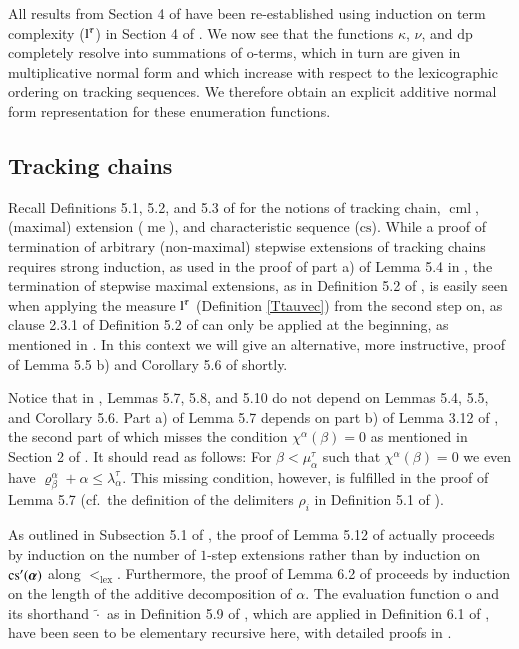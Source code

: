 \documentclass[3p,10pt,times]{elsarticle}
\newcommand{\al}{\alpha}
\newcommand{\alvec}{{\vec{\al}}}
\newcommand{\be}{\beta}
\newcommand{\la}{\lambda}
\newcommand{\ka}{\kappa}
\newcommand{\tauvec}{{\vec{\tau}}}
\newcommand{\klex}{<_\mathrm{\scriptscriptstyle{lex}}}
\newcommand{\ltvec}{{\operatorname{l}^\tauvec}}
\newcommand{\latal}{{\la^\tau_\al}}
\newcommand{\chial}{\chi^\al}
\newcommand{\mutal}{\mu^\tau_\al}
\newcommand{\rhoalbe}{{\varrho^\al_\be}}
\newcommand{\cs}{{\mathrm{cs}}}
\newcommand{\cspr}{{\mathrm{cs}^\prime}}
\newcommand{\dpf}{\mathrm{dp}}
\newcommand{\ov}{\mathrm{o}}
\newcommand{\cml}{\operatorname{cml}}
\newcommand{\me}{\operatorname{me}}
\def\vec#1{\mathchoice{\mbox{\boldmath$\displaystyle#1$}}
{\mbox{\boldmath$\textstyle#1$}}
{\mbox{\boldmath$\scriptstyle#1$}}
{\mbox{\boldmath$\scriptscriptstyle#1$}}}
\begin{document}
All results from Section 4 of \cite{CWc} have been re-established using induction on term complexity ($\ltvec$) in Section 4 of \cite{W}.
We now see that the functions $\ka$, $\nu$, and $\dpf$ completely resolve into summations of $\ov$-terms, which in turn are given in
multiplicative normal form and which increase with respect to the lexicographic ordering on tracking sequences. We therefore obtain
an explicit additive normal form representation for these enumeration functions.

\subsection{Tracking chains}\label{tcacsec}
Recall Definitions 5.1, 5.2, and 5.3 of \cite{CWc} for the notions of tracking chain, $\cml$\index{$\cml$}, (maximal) extension ($\me$)\index{$\me$},
and characteristic sequence\index{characteristic sequence, $\cs$} ($\cs$). 
While a proof of termination of 
arbitrary (non-maximal) stepwise extensions of tracking chains requires strong induction, as used in the proof of part a) of Lemma 5.4 
in \cite{CWc}, the termination of stepwise maximal extensions, as in Definition 5.2 of \cite{CWc}, is easily seen when applying the measure
$\ltvec$ (Definition \ref{Ttauvec}) from the second step on, as clause 2.3.1 of Definition 5.2 of \cite{CWc} can only be applied at the 
beginning, as mentioned in \cite{W}. In this context we will give an alternative, more instructive, proof of Lemma 5.5 b) and Corollary 5.6
of \cite{CWc} shortly. 

Notice that in \cite{CWc}, Lemmas 5.7, 5.8, and 5.10 do not depend on Lemmas 5.4, 5.5, and Corollary 5.6.   
Part a) of Lemma 5.7 depends on part b) of Lemma 3.12 of \cite{CWc}, the second part of which misses the condition $\chial(\be)=0$ as mentioned
in Section 2 of \cite{W}.
It should read as follows: For $\be<\mutal$ such that $\chial(\be)=0$ we even have $\rhoalbe+\al\le\latal$. This missing condition, however,
is fulfilled in the proof of Lemma 5.7 (cf.\ the definition of the delimiters $\rho_i$ in Definition 5.1 of \cite{CWc}).

As outlined in Subsection 5.1 of \cite{W}, the proof of Lemma 5.12 of \cite{CWc} actually proceeds by induction on the number of 
$1$-step extensions rather than by induction on $\cspr(\alvec)$ along $\klex$. Furthermore, the proof of Lemma 6.2 of \cite{CWc} proceeds 
by induction on the length of the additive decomposition of $\al$. The evaluation function $\ov$ and its shorthand 
$\tilde{\cdot}$\index{$\tilde{\cdot}$} as in 
Definition 5.9 of \cite{CWc}, which are applied in Definition 6.1 of \cite{CWc}, have been seen to be elementary recursive here, 
with detailed proofs in \cite{W}.
\end{document}
